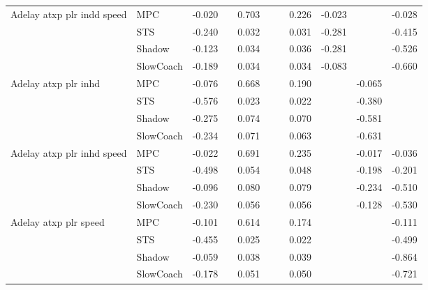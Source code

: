 \begin{tabular}{|l|l|*{9}{c|}}
\midrule
Adelay atxp plr indd speed    & MPC &   -0.020 &        &     0.703 &     &     &  0.226 &  -0.023 &      &   -0.028 \\
                              & STS &   -0.240 &        &     0.032 &     &     &  0.031 &  -0.281 &      &   -0.415 \\
                              & Shadow &   -0.123 &        &     0.034 &     &     &  0.036 &  -0.281 &      &   -0.526 \\
                              & SlowCoach &   -0.189 &        &     0.034 &     &     &  0.034 &  -0.083 &      &   -0.660 \\
\midrule
Adelay atxp plr inhd    & MPC &   -0.076 &        &     0.668 &     &     &  0.190 &      &  -0.065 &       \\
                              & STS &   -0.576 &        &     0.023 &     &     &  0.022 &      &  -0.380 &       \\
                              & Shadow &   -0.275 &        &     0.074 &     &     &  0.070 &      &  -0.581 &       \\
                              & SlowCoach &   -0.234 &        &     0.071 &     &     &  0.063 &      &  -0.631 &       \\
\midrule
Adelay atxp plr inhd speed    & MPC &   -0.022 &        &     0.691 &     &     &  0.235 &      &  -0.017 &   -0.036 \\
                              & STS &   -0.498 &        &     0.054 &     &     &  0.048 &      &  -0.198 &   -0.201 \\
                              & Shadow &   -0.096 &        &     0.080 &     &     &  0.079 &      &  -0.234 &   -0.510 \\
                              & SlowCoach &   -0.230 &        &     0.056 &     &     &  0.056 &      &  -0.128 &   -0.530 \\
\midrule
Adelay atxp plr speed    & MPC &   -0.101 &        &     0.614 &     &     &  0.174 &      &      &   -0.111 \\
                              & STS &   -0.455 &        &     0.025 &     &     &  0.022 &      &      &   -0.499 \\
                              & Shadow &   -0.059 &        &     0.038 &     &     &  0.039 &      &      &   -0.864 \\
                              & SlowCoach &   -0.178 &        &     0.051 &     &     &  0.050 &      &      &   -0.721 \\
\midrule

\end{tabular}
